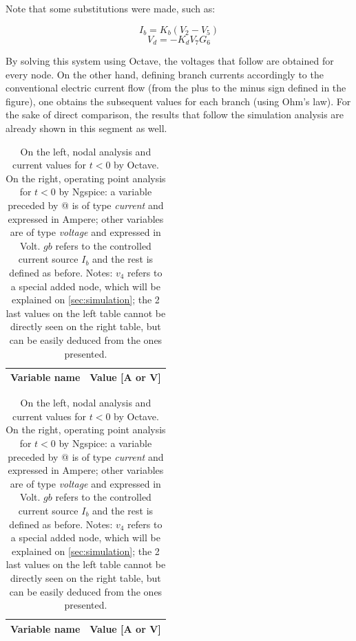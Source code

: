 Note that some substitutions were made, such as:

\vspace{3mm}
\begin{equation}
  \label{eq4}
   I_b = K_b(V_2-V_5)
\end{equation}
\begin{equation}
  \label{eq5}
   V_d=-K_dV_7G_6
\end{equation}
\vspace{3mm}


\par By solving this system using Octave, the voltages that follow are obtained for every node. On the other hand, defining branch currents accordingly to the conventional electric current flow (from the plus to the minus sign defined in the figure), one obtains the subsequent values for each branch (using Ohm's law). For the sake of direct comparison, the results that follow the simulation analysis are already shown in this segment as well.

\renewcommand{\arraystretch}{1.5}
\begin{table}[htbp]
\begin{minipage}{.3\textwidth}
\centering

\begin{tabular}{|c|c|}
\hline    
\textbf{Variable name} & \textbf{Value [A or V]} \\ \hline

\end{tabular}
\end{minipage}
\hspace{50px}
\begin {minipage}{.8\textwidth}
\centering

\begin{tabular}{|c|c|}
\hline    
\textbf{Variable name} & \textbf{Value [A or V]} \\ \hline

\end{tabular}
\end{minipage}
\caption{On the left, nodal analysis and current values for $t<0$ by Octave. On the right, operating point analysis for $t<0$ by Ngspice: a variable preceded by @ is of type \textit{current} and expressed in Ampere; other variables are of type \textit {voltage} and expressed in Volt. $gb$ refers to the controlled current source $I_b$ and the rest is defined as before. \small Notes: $v_4$ refers to a special added node, which will be explained on \ref{sec:simulation}; the 2 last values on the left table cannot be directly seen on the right table, but can be easily deduced from the ones presented.}
\label{tab_1}
\end{table}



